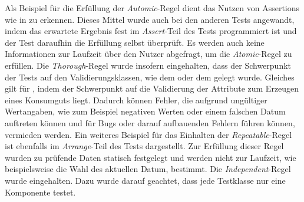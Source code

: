 Als Beispiel für die Erfüllung der \textit{Automic}-Regel dient das Nutzen von Assertions wie in \href{https://github.com/lucasmerkel/dhbw-advancedswe-programmentwurf/blob/5764d7da4cfd0562ed8e96128e92f85c30b7309d/swe_programmentwurf/consumergoods-inventory-planner/0-cip-plugins/src/test/java/de/dhbw/cip/DateValidationTest.java}{} zu erkennen.
Dieses Mittel wurde auch bei den anderen Tests angewandt, indem das erwartete Ergebnis fest im \textit{Assert}-Teil des Tests programmiert ist und der Test daraufhin die Erfüllung selbst überprüft.
Es werden auch keine Informationen zur Laufzeit über den Nutzer abgefragt, um die \textit{Atomic}-Regel zu erfüllen.
Die \textit{Thorough}-Regel wurde insofern eingehalten, dass der Schwerpunkt der Tests auf den Validierungsklassen, wie dem \href{https://github.com/lucasmerkel/dhbw-advancedswe-programmentwurf/blob/5764d7da4cfd0562ed8e96128e92f85c30b7309d/swe_programmentwurf/consumergoods-inventory-planner/0-cip-plugins/src/test/java/de/dhbw/cip/DateValidationTest.java}{} oder dem \href{https://github.com/lucasmerkel/dhbw-advancedswe-programmentwurf/blob/5764d7da4cfd0562ed8e96128e92f85c30b7309d/swe_programmentwurf/consumergoods-inventory-planner/0-cip-plugins/src/test/java/de/dhbw/cip/UnitOfMeasureValueValidationTest.java}{} gelegt wurde.
Gleiches gilt für \href{https://github.com/lucasmerkel/dhbw-advancedswe-programmentwurf/blob/5764d7da4cfd0562ed8e96128e92f85c30b7309d/swe_programmentwurf/consumergoods-inventory-planner/0-cip-plugins/src/test/java/de/dhbw/cip/StoreConsumerGoodsTest.java}{}, indem der Schwerpunkt auf die Validierung der Attribute zum Erzeugen eines Konsumguts liegt.
Dadurch können Fehler, die aufgrund ungültiger Wertangaben, wie zum Beispiel negativen Werten oder einem falschen Datum auftreten können und für Bugs oder darauf aufbauenden Fehlern führen können, vermieden werden.
Ein weiteres Beispiel für das Einhalten der \textit{Repeatable}-Regel ist ebenfalls im \textit{Arrange}-Teil des Tests \href{https://github.com/lucasmerkel/dhbw-advancedswe-programmentwurf/blob/5764d7da4cfd0562ed8e96128e92f85c30b7309d/swe_programmentwurf/consumergoods-inventory-planner/0-cip-plugins/src/test/java/de/dhbw/cip/DateValidationTest.java}{} dargestellt.
Zur Erfüllung dieser Regel wurden zu prüfende Daten statisch festgelegt und werden nicht zur Laufzeit, wie beispielsweise die Wahl des aktuellen Datum, bestimmt.
Die \textit{Independent}-Regel wurde eingehalten. Dazu wurde darauf geachtet, dass jede Testklasse nur eine Komponente testet.
